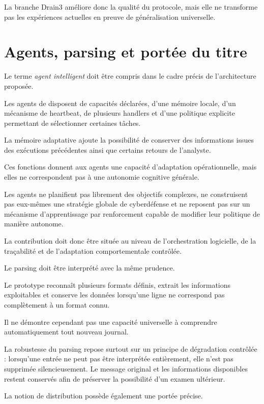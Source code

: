 La branche Drain3 améliore donc la qualité du protocole, mais elle ne transforme pas les expériences actuelles en preuve de généralisation universelle.

\section{Agents, parsing et portée du titre}

Le terme \textit{agent intelligent} doit être compris dans le cadre précis de l'architecture proposée.

Les agents de \logminer{} disposent de capacités déclarées, d'une mémoire locale, d'un mécanisme de heartbeat, de plusieurs handlers et d'une politique explicite permettant de sélectionner certaines tâches.

La mémoire adaptative ajoute la possibilité de conserver des informations issues des exécutions précédentes ainsi que certains retours de l'analyste.

Ces fonctions donnent aux agents une capacité d'adaptation opérationnelle, mais elles ne correspondent pas à une autonomie cognitive générale.

Les agents ne planifient pas librement des objectifs complexes, ne construisent pas eux-mêmes une stratégie globale de cyberdéfense et ne reposent pas sur un mécanisme d'apprentissage par renforcement capable de modifier leur politique de manière autonome.

La contribution doit donc être située au niveau de l'orchestration logicielle, de la traçabilité et de l'adaptation comportementale contrôlée.

Le parsing doit être interprété avec la même prudence.

Le prototype reconnaît plusieurs formats définis, extrait les informations exploitables et conserve les données lorsqu'une ligne ne correspond pas complètement à un format connu.

Il ne démontre cependant pas une capacité universelle à comprendre automatiquement tout nouveau journal.

La robustesse du parsing repose surtout sur un principe de dégradation contrôlée : lorsqu'une entrée ne peut pas être interprétée entièrement, elle n'est pas supprimée silencieusement. Le message original et les informations disponibles restent conservés afin de préserver la possibilité d'un examen ultérieur.

La notion de distribution possède également une portée précise.

